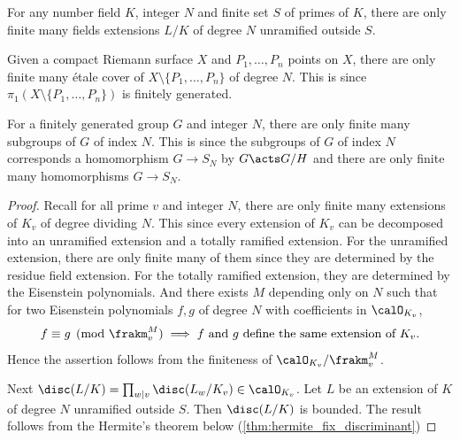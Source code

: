     \begin{theorem}
        For any number field \(K\), integer \(N\) and finite set \(S\) of primes of \(K\), 
        there are only finite many fields extensions \(L/K\) of degree \(N\) unramified outside \(S\).
    \end{theorem}
    \begin{remark}
        Given a compact Riemann surface \(X\) and \(P_1, \dots, P_n\) points on \(X\), 
        there are only finite many \'etale cover of \(X\setminus\{P_1, \dots, P_n\}\) of degree \(N\).
        This is since \(\pi_1(X\setminus\{P_1, \dots, P_n\})\) is finitely generated.

        For a finitely generated group \(G\) and integer \(N\), there are only finite many subgroups of \(G\) of index \(N\).
        This is since the subgroups of \(G\) of index \(N\) corresponds a homomorphism \(G \to S_N\) by \(G \acts G/H\) and there are only finite many homomorphisms \(G \to S_N\).
    \end{remark}
    \begin{proof}
        Recall for all prime \(v\) and integer \(N\), there are only finite many extensions of \(K_v\) of degree dividing \(N\).
        This since every extension of \(K_v\) can be decomposed into an unramified extension and a totally ramified extension.
        For the unramified extension, there are only finite many of them since they are determined by the residue field extension.
        For the totally ramified extension, they are determined by the Eisenstein polynomials.
        And there exists \(M\) depending only on \(N\) such that for two Eisenstein polynomials $f, g$ of degree \(N\) with coefficients in \(\calO_{K_v}\),
        \[ f \equiv g \pmod{\frakm_v^M} \implies f \text{ and } g \text{ define the same extension of } K_v. \]
        Hence the assertion follows from the finiteness of \(\calO_{K_v}/\frakm_v^M\).

        Next \(\disc(L/K) = \prod_{w|v} \disc(L_w/K_v) \in \calO_{K_v}\).
        Let \(L\) be an extension of \(K\) of degree \(N\) unramified outside \(S\).
        Then \(\disc(L/K)\) is bounded.
        The result follows from the Hermite's theorem below (\cref{thm:hermite_fix_discriminant})
    \end{proof}


